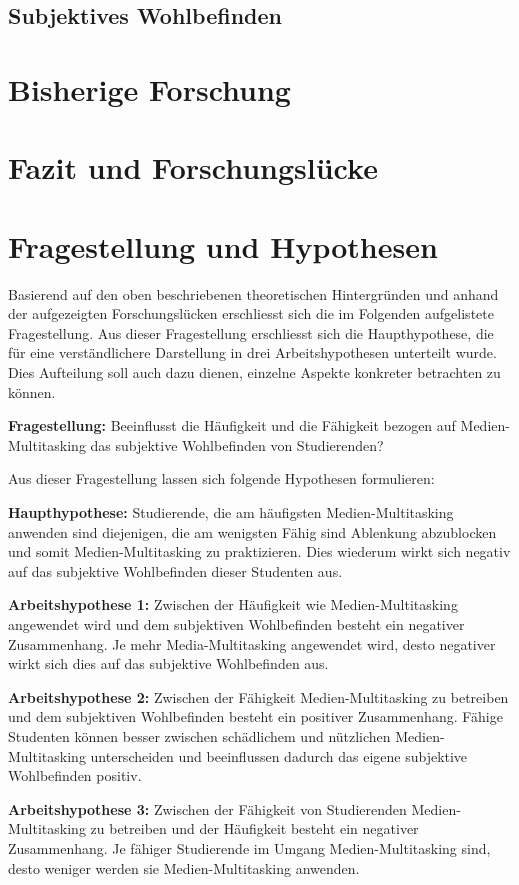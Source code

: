 \subsection{Subjektives Wohlbefinden}\label{subsection.subjektivesWohlbefinden}

\section{Bisherige Forschung}\label{section.bisherigeForschung}

\section{Fazit und Forschungslücke}\label{section.fazitLücke}

\section{Fragestellung und Hypothesen}\label{section.fragestellung}
Basierend auf den oben beschriebenen theoretischen Hintergründen und anhand der aufgezeigten Forschungslücken erschliesst sich die im Folgenden aufgelistete Fragestellung. Aus dieser Fragestellung erschliesst sich die Haupthypothese, die für eine verständlichere Darstellung in drei Arbeitshypothesen unterteilt wurde. Dies Aufteilung soll auch dazu dienen, einzelne Aspekte konkreter betrachten zu können. \par
\textbf{Fragestellung:} Beeinflusst die Häufigkeit und die Fähigkeit bezogen auf Medien-Multitasking das subjektive Wohlbefinden von Studierenden?\par
Aus dieser Fragestellung lassen sich folgende Hypothesen formulieren:\par
\textbf{Haupthypothese:}
Studierende, die am häufigsten Medien-Multitasking anwenden sind diejenigen, die am wenigsten Fähig sind Ablenkung abzublocken und somit Medien-Multitasking zu praktizieren. Dies wiederum wirkt sich negativ auf das subjektive Wohlbefinden dieser Studenten aus.\par
\textbf{Arbeitshypothese 1:} Zwischen der Häufigkeit wie Medien-Multitasking angewendet wird und dem subjektiven Wohlbefinden besteht ein negativer Zusammenhang. Je mehr Media-Multitasking angewendet wird, desto negativer wirkt sich dies auf das subjektive Wohlbefinden aus.\par
\textbf{Arbeitshypothese 2:} Zwischen der Fähigkeit Medien-Multitasking zu betreiben und dem subjektiven Wohlbefinden besteht ein positiver Zusammenhang. Fähige Studenten können besser zwischen schädlichem und nützlichen Medien-Multitasking unterscheiden und beeinflussen dadurch das eigene subjektive Wohlbefinden positiv.\par
\textbf{Arbeitshypothese 3:} Zwischen der Fähigkeit von Studierenden Medien-Multitasking zu betreiben und der Häufigkeit besteht ein negativer Zusammenhang. Je fähiger Studierende im Umgang Medien-Multitasking sind, desto weniger werden sie Medien-Multitasking anwenden.





